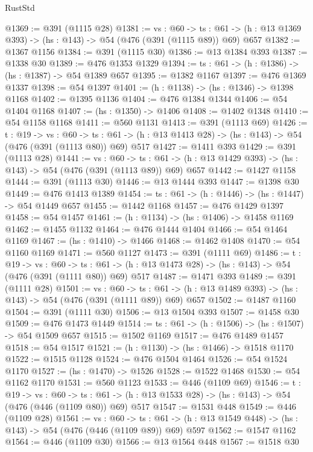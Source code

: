 \begin{lexlean}{RustStd}
\begin{coremodule}
{\begin{coremodule}
{{{{{{{@1369 := @391 (@1115 @28)
@1381 := {vs : @60} ->
  {ts : @61} -> (h : @13 @1369 @393) -> (hs : @143) -> @54 (@476 (@391 (@1115 @89)) @69) @657
@1382 := @1367 @1156
@1384 := @391 (@1115 @30)
@1386 := @13 @1384 @393
@1387 := @1338 @30
@1389 := @476 @1353 @1329
@1394 := {ts : @61} -> (h : @1386) -> (hs : @1387) -> @54 @1389 @657
@1395 := @1382 @1167
@1397 := @476 @1369 @1337
@1398 := @54 @1397
@1401 := (h : @1138) -> (hs : @1346) -> @1398 @1168
@1402 := @1395 @1136
@1404 := @476 @1384 @1344
@1406 := @54 @1404 @1168
@1407 := (hs : @1350) -> @1406
@1408 := @1402 @1348
@1410 := @54 @1158 @1168
@1411 := @560 @1131
@1413 := @391 (@1113 @69)
@1426 := {t : @19} ->
  {vs : @60} ->
  {ts : @61} -> (h : @13 @1413 @28) -> (hs : @143) -> @54 (@476 (@391 (@1113 @80)) @69) @517
@1427 := @1411 @393
@1429 := @391 (@1113 @28)
@1441 := {vs : @60} ->
  {ts : @61} -> (h : @13 @1429 @393) -> (hs : @143) -> @54 (@476 (@391 (@1113 @89)) @69) @657
@1442 := @1427 @1158
@1444 := @391 (@1113 @30)
@1446 := @13 @1444 @393
@1447 := @1398 @30
@1449 := @476 @1413 @1389
@1454 := {ts : @61} -> (h : @1446) -> (hs : @1447) -> @54 @1449 @657
@1455 := @1442 @1168
@1457 := @476 @1429 @1397
@1458 := @54 @1457
@1461 := (h : @1134) -> (hs : @1406) -> @1458 @1169
@1462 := @1455 @1132
@1464 := @476 @1444 @1404
@1466 := @54 @1464 @1169
@1467 := (hs : @1410) -> @1466
@1468 := @1462 @1408
@1470 := @54 @1160 @1169
@1471 := @560 @1127
@1473 := @391 (@1111 @69)
@1486 := {t : @19} ->
  {vs : @60} ->
  {ts : @61} -> (h : @13 @1473 @28) -> (hs : @143) -> @54 (@476 (@391 (@1111 @80)) @69) @517
@1487 := @1471 @393
@1489 := @391 (@1111 @28)
@1501 := {vs : @60} ->
  {ts : @61} -> (h : @13 @1489 @393) -> (hs : @143) -> @54 (@476 (@391 (@1111 @89)) @69) @657
@1502 := @1487 @1160
@1504 := @391 (@1111 @30)
@1506 := @13 @1504 @393
@1507 := @1458 @30
@1509 := @476 @1473 @1449
@1514 := {ts : @61} -> (h : @1506) -> (hs : @1507) -> @54 @1509 @657
@1515 := @1502 @1169
@1517 := @476 @1489 @1457
@1518 := @54 @1517
@1521 := (h : @1130) -> (hs : @1466) -> @1518 @1170
@1522 := @1515 @1128
@1524 := @476 @1504 @1464
@1526 := @54 @1524 @1170
@1527 := (hs : @1470) -> @1526
@1528 := @1522 @1468
@1530 := @54 @1162 @1170
@1531 := @560 @1123
@1533 := @446 (@1109 @69)
@1546 := {t : @19} ->
  {vs : @60} ->
  {ts : @61} -> (h : @13 @1533 @28) -> (hs : @143) -> @54 (@476 (@446 (@1109 @80)) @69) @517
@1547 := @1531 @448
@1549 := @446 (@1109 @28)
@1561 := {vs : @60} ->
  {ts : @61} -> (h : @13 @1549 @448) -> (hs : @143) -> @54 (@476 (@446 (@1109 @89)) @69) @597
@1562 := @1547 @1162
@1564 := @446 (@1109 @30)
@1566 := @13 @1564 @448
@1567 := @1518 @30
}}}}}}}
\end{coremodule}}
\end{coremodule}
\end{lexlean}

